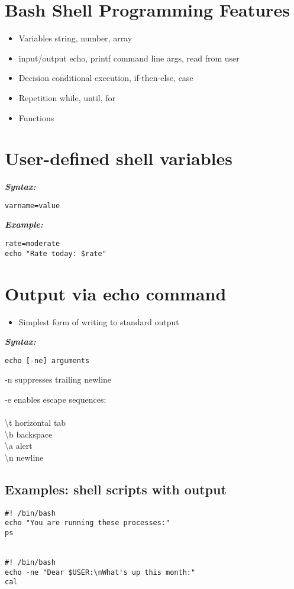 \documentclass{report}
\begin{document}
\section{Bash Shell Programming Features}
\begin{itemize}
  \item Variables 
    \subitem string, number, array
  \item input/output
    \subitem echo, printf
    \subitem command line args, read from user
  \item Decision
    \subitem conditional execution, if-then-else, case
  \item Repetition
    \subitem while, until, for
  \item Functions
\end{itemize}
\section{User-defined shell variables}
\textit{\textbf{Syntax:}}
\begin{verbatim}
varname=value
\end{verbatim}
\textit{\textbf{Example:}}
\begin{verbatim}
rate=moderate
echo "Rate today: $rate"
\end{verbatim}
\section{Output via echo command}
\begin{itemize}
  \item Simplest form of writing to standard output 
\end{itemize}
\textit{\textbf{Syntax:}}
\begin{verbatim}
echo [-ne] arguments
\end{verbatim}
-n suppresses trailing newline
\vspace{2mm}

\noindent -e enables escape sequences:
\\ \\ 
\textbackslash t horizontal tab \\
\textbackslash b backspace \\
\textbackslash a alert \\
\textbackslash n newline
\subsection{Examples: shell scripts with output}
\begin{verbatim}
#! /bin/bash
echo "You are running these processes:"
ps


#! /bin/bash
echo -ne "Dear $USER:\nWhat's up this month:"
cal
\end{verbatim}
\end{document}
